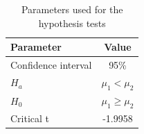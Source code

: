 \documentclass{ieeeaccess}
\providecommand{\e}[1]{\ensuremath{\times 10^{#1}}}
\begin{document}
\begin{table}[]
  \caption{Parameters used for the hypothesis tests}
  \small
  \centering
  \begin{tabular}{lc}
    \textbf{Parameter} & \textbf{Value} \\
    \hline
    Confidence interval & 95\% \\
    $H_a$ & $\mu_1 < \mu_2$ \\
    $H_0$ & $\mu_1 \geq \mu_2$ \\
    Critical t & -1.9958 \\
  \end{tabular}
  \label{table:parameters-tests}
\end{table}

\end{document}
